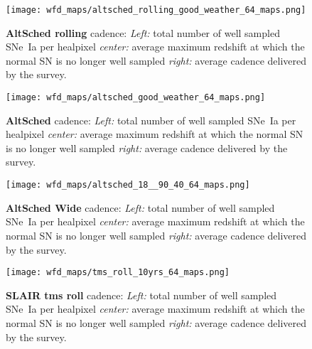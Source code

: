 

\begin{figure}[h!]
  \begin{center}
    \texttt{[image: wfd\_maps/altsched\_rolling\_good\_weather\_64\_maps.png]}
    \caption{{\bf AltSched rolling} cadence: {\em Left:} total number
      of well sampled SNe~Ia per healpixel {\em center:} average
      maximum redshift at which the normal SN is no longer well
      sampled {\em right:} average cadence delivered by the survey.}
    \label{fig:altsched_rolling_good_weather}
  \end{center}
\end{figure}


\begin{figure}[h!]
  \begin{center}
    \texttt{[image: wfd\_maps/altsched\_good\_weather\_64\_maps.png]}
    \caption{{\bf AltSched} cadence: {\em Left:} total number of well
      sampled SNe~Ia per healpixel {\em center:} average maximum
      redshift at which the normal SN is no longer well sampled {\em
        right:} average cadence delivered by the survey.}
    \label{fig:altsched_good_weather}
  \end{center}
\end{figure}

\begin{figure}[h!]
  \begin{center}
    \texttt{[image: wfd\_maps/altsched\_18\_\_90\_40\_64\_maps.png]}
    \caption{{\bf AltSched Wide} cadence: {\em Left:} total number of well
      sampled SNe~Ia per healpixel {\em center:} average maximum
      redshift at which the normal SN is no longer well sampled {\em
        right:} average cadence delivered by the survey.}
  \end{center}
  \label{fig:altsched_wide}
\end{figure}

\begin{figure}[h!]
  \begin{center}
    \texttt{[image: wfd\_maps/tms\_roll\_10yrs\_64\_maps.png]}
    \caption{{\bf SLAIR tms roll} cadence: {\em Left:} total number of well
      sampled SNe~Ia per healpixel {\em center:} average maximum
      redshift at which the normal SN is no longer well sampled {\em
        right:} average cadence delivered by the survey.}
    \label{fig:tms_roll}
  \end{center}
\end{figure}

